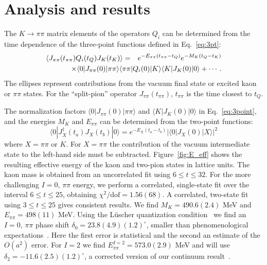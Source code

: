 \documentclass[aps,prl,
superscriptaddress,
showpacs,
preprintnumbers,
bibnotes,
amsmath,
amssymb,
twocolumn,
floatfix,
]{revtex4-1}
\begin{document}

\section{Analysis and results}

The $K\to\pi\pi$ matrix elements of the operators $Q_i$ can be determined from the time dependence of the three-point functions defined in Eq.~\eqref{eq:3pt}:
\begin{eqnarray}
\langle J_{\pi\pi}(t_{\pi\pi})  Q_i(t_{Q})  J_K(t_K)\rangle &=&
e^{-E_{\pi\pi}(t_{\pi\pi} - t_Q)} e^{-M_K(t_Q-t_K)} \nonumber \\
&& \hskip -1.5 in \times  \langle 0|J_{\pi\pi}(0) |\pi\pi \rangle\langle \pi\pi| Q_i(0) |K\rangle \langle K| J_K(0)|0\rangle + \cdots.
\label{eq:3point}
\end{eqnarray} 
The ellipses represent contributions from the vacuum final state or excited kaon or $\pi\pi$ states.  For the ``split-pion'' operator $J_{\pi\pi}(t_{\pi\pi})$, $t_{\pi\pi}$ is the time closest to $t_Q$.  

The normalization factors $ \langle 0|J_{\pi\pi}(0) |\pi\pi \rangle$ and $\langle K| J_K(0)|0\rangle$ in Eq.~\eqref{eq:3point}, and the energies $M_K$ and $E_{\pi\pi}$ can be determined from the two-point functions:
\begin{equation}
\langle 0|J_X^\dagger(t_a) J_X(t_b)|0 \rangle = e^{-E_X(t_a-t_b)} \bigl|\langle 0|J_X(0)|X\rangle\bigr|^2
\label{eq:2point}
\end{equation}
where $X=\pi\pi$ or $K$.  For $X=\pi\pi$ the contribution of the vacuum intermediate state to the left-hand side must be subtracted.  Figure~\ref{fig:E_eff} shows the resulting effective energy of the kaon and two-pion states in lattice units. The kaon mass is obtained from an uncorrelated fit using $6 \le t \le 32$.  For the more challenging $I=0$, $\pi\pi$ energy, we perform a correlated, single-state fit over the interval $6 \le t \le 25$, obtaining $\chi^2/{\mathrm{dof}}=1.56(68) $.  A correlated, two-state fit using $3 \le t \le 25$ gives consistent results.  We find $M_K=490.6(2.4)$ MeV and $E_{\pi\pi}=498(11)$ MeV.  Using the L\"uscher quantization condition~\cite{Luscher:1986pf,Luscher:1990ux} we find an $I=0$, $\pi\pi$ phase shift $\delta_0 = 23.8(4.9)(1.2)^\circ$, smaller than phenomenological expectations~\cite{Colangelo:2001df,Colangelo:2015kha}.  Here the first error is statistical and the second an estimate of the $O(a^2)$ error.  For $I=2$ we find  $E_{\pi\pi}^{I=2}=573.0(2.9)$ MeV and will use $\delta_2= -11.6(2.5)(1.2)^\circ$, a corrected version of our continuum result~\cite{Blum:2015ywa}. 
\end{document}
